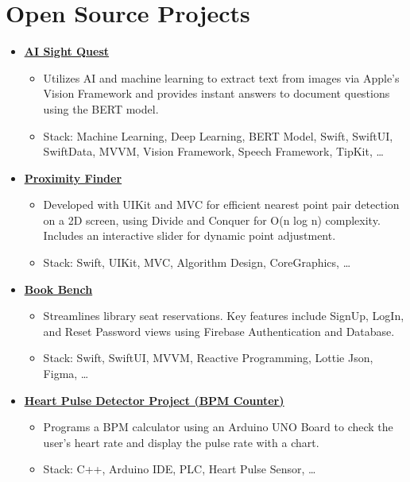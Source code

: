 \documentclass[letter,12pt]{article}
\newcommand{\customsquare}{\raisebox{0.25ex}{\scalebox{0.45}{$\blacksquare$}}}
\begin{document}
\section*{Open Source Projects}
\begin{itemize}[label={\customsquare}]
    \item \href{https://github.com/nsswifter/AISightQuest}{\underline{\textbf{AI Sight Quest}}}
    \begin{itemize}
        \item Utilizes AI and machine learning to extract text from images via Apple's \mbox{Vision} Framework and provides instant answers to document questions using the BERT model.
        \item Stack: Machine Learning, Deep Learning, BERT Model, Swift, SwiftUI, SwiftData, MVVM, \mbox{Vision} Framework, Speech Framework, TipKit, …
    \end{itemize}

    \item \href{https://github.com/nsswifter/ProximityFinder}{\underline{\textbf{Proximity Finder}}}
    \begin{itemize}
        \item Developed with UIKit and MVC for efficient nearest point pair detection on a 2D screen, using Divide and Conquer for O(n log n) complexity. Includes an interactive slider for dynamic point adjustment.
        \item Stack: Swift, UIKit, MVC, Algorithm Design, CoreGraphics, … 
    \end{itemize}

    \item \href{https://github.com/nsswifter/BookBench}{\underline{\textbf{Book Bench}}}
    \begin{itemize}
        \item Streamlines library seat reservations. Key features include SignUp, LogIn, and Reset Password views using Firebase Authentication and Database.
        \item Stack: Swift, SwiftUI, MVVM, Reactive Programming, Lottie Json, Figma, …
    \end{itemize}

    \item \href{https://github.com/nsswifter/Heart-Pulse-Detector-Using-Arduino}{\underline{\textbf{Heart Pulse Detector Project (BPM Counter)}}}
    \begin{itemize}
        \item Programs a BPM calculator using an Arduino UNO Board to check the user's heart rate and display the pulse rate with a chart.
        \item Stack: C++, Arduino IDE, PLC, Heart Pulse Sensor, …
    \end{itemize}


\end{itemize}
\end{document}
